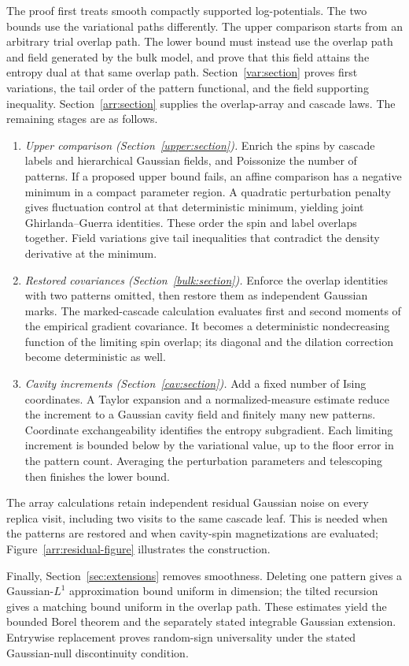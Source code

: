 The proof first treats smooth compactly supported log-potentials.
The two bounds use the variational paths differently. The upper comparison
starts from an arbitrary trial overlap path. The lower bound must instead
use the overlap path and field generated by the bulk model, and prove that
this field attains the entropy dual at that same overlap path.
Section~\ref{var:section} proves first variations, the tail order of the
pattern functional, and the field supporting inequality.
Section~\ref{arr:section} supplies the overlap-array and cascade laws.
The remaining stages are as follows.
\begin{enumerate}
 \item \emph{Upper comparison (Section~\ref{upper:section}).}
 Enrich the spins by cascade labels and hierarchical Gaussian fields,
 and Poissonize the number of patterns. If a proposed upper bound fails,
 an affine comparison has a negative minimum in a compact parameter
 region. A quadratic perturbation penalty gives fluctuation control at
 that deterministic minimum, yielding joint Ghirlanda--Guerra identities.
 These order the spin and label overlaps together. Field variations give
 tail inequalities that contradict the density derivative at the minimum.
 \item \emph{Restored covariances (Section~\ref{bulk:section}).}
 Enforce the overlap identities with two patterns omitted, then restore
 them as independent Gaussian marks. The marked-cascade calculation
 evaluates first and second moments of the empirical gradient covariance.
 It becomes a deterministic nondecreasing function of the limiting spin
 overlap; its diagonal and the dilation correction become deterministic
 as well.
 \item \emph{Cavity increments (Section~\ref{cav:section}).}
 Add a fixed number of Ising coordinates. A Taylor expansion and a
 normalized-measure estimate reduce the increment to a Gaussian cavity
 field and finitely many new patterns. Coordinate exchangeability
 identifies the entropy subgradient. Each limiting increment is bounded
 below by the variational value, up to the floor error in the pattern
 count. Averaging the perturbation parameters and telescoping then
 finishes the lower bound.
\end{enumerate}
The array calculations retain independent residual Gaussian noise on every
replica visit, including two visits to the same cascade leaf. This is needed
when the patterns are restored and when cavity-spin magnetizations are
evaluated; Figure~\ref{arr:residual-figure} illustrates the construction.

Finally, Section~\ref{sec:extensions} removes smoothness. Deleting one
pattern gives a Gaussian-$L^1$ approximation bound uniform in dimension;
the tilted recursion gives a matching bound uniform in the overlap path.
These estimates yield the bounded Borel theorem and the separately stated
integrable Gaussian extension. Entrywise replacement proves random-sign
universality under the stated Gaussian-null discontinuity condition.
